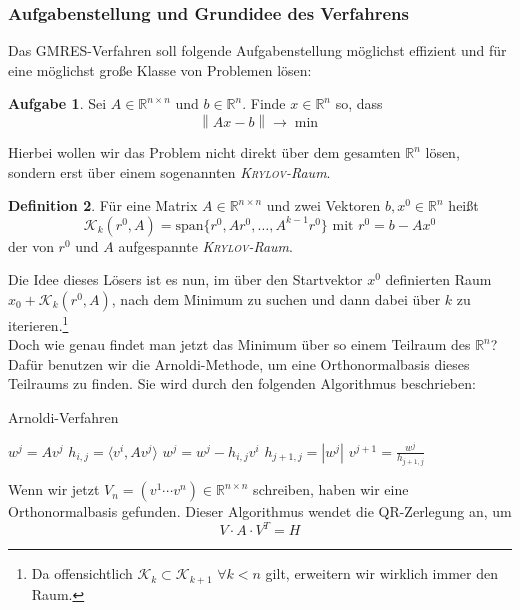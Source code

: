 \documentclass[12pt,a4paper]{scrartcl}
\numberwithin{equation}{section} %
\theoremstyle{definition}
\newtheorem{auf}{Aufgabe}
\newtheorem{defn}[auf]{Definition}
\theoremstyle{plain}
\newcommand{\abs}[1]{\left\vert #1\right\vert}
\newcommand{\rr}{\mathbb{R}}
\newcommand{\norm}[1]{\left\lVert#1\right\rVert}
\begin{document}
\subsubsection{Aufgabenstellung und Grundidee des Verfahrens}
Das GMRES-Verfahren soll folgende Aufgabenstellung möglichst effizient und für eine möglichst große Klasse von Problemen lösen:
\begin{auf}
Sei $A\in\rr^{n\times n}$ und $b\in\rr^n$. Finde $x\in\rr^n$ so, dass 
\begin{equation}
\norm{Ax-b}\to\min
\end{equation}
\end{auf}
Hierbei wollen wir das Problem nicht direkt über dem gesamten $\rr^n$ lösen, sondern erst über einem sogenannten \emph{\textsc{Krylov}-Raum}.
\begin{defn}
Für eine Matrix $A\in\rr^{n\times n}$ und zwei Vektoren $b,x^0\in\rr^n$ heißt
\begin{equation}
\mathcal{K}_k(r^0,A)=\text{span}\{r^0,Ar^0,\dotsc,A^{k-1}r^0\}\text{ mit }r^0=b-Ax^0
\end{equation}
der von $r^0$ und $A$ aufgespannte \emph{\textsc{Krylov}-Raum}.
\end{defn}
Die Idee dieses Lösers ist es nun, im über den Startvektor $x^0$ definierten Raum $x_0+\mathcal{K}_k(r^0,A)$, nach dem Minimum zu suchen und dann dabei über $k$ zu iterieren.\footnote{Da offensichtlich $\mathcal{K}_k\subset\mathcal{K}_{k+1}$ $\forall k<n$ gilt,   erweitern wir wirklich immer den Raum.}\\
Doch wie genau findet man jetzt das Minimum über so einem Teilraum des $\rr^n$? 
Dafür benutzen wir die Arnoldi-Methode, um eine Orthonormalbasis dieses Teilraums zu finden. Sie wird durch den folgenden Algorithmus beschrieben:
\begin{algorithm}
\caption{Arnoldi-Verfahren}
\label{alg:1}
\begin{algorithmic}
\STATE$w^j=Av^j$
\STATE$h_{i,j}=\langle v^i,Av^j\rangle$
\STATE $w^j=w^j-h_{i,j}v^i$
\ENDFOR
\STATE$h_{j+1,j}=\abs{w^j}$
\STATE$v^{j+1}=\frac{w^j}{h_{j+1,j}}$
\ENDFOR
\end{algorithmic}
\end{algorithm}
Wenn wir jetzt $V_n=(v^1\dotsb v^{n})\in\rr^{n\times n}$ schreiben, haben wir eine Orthonormalbasis gefunden.
Dieser Algorithmus wendet die QR-Zerlegung an, um 
\begin{equation}
V\cdot A\cdot V^T=H
\end{equation}
\end{document}
